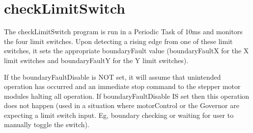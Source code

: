 				
	\section{checkLimitSwitch}
	\label{sec:PLC-flowcharts-limit}
		The checkLimitSwitch program is run in a Periodic Task of 10ms and monitors the four limit switches. Upon detecting a rising edge from one of these limit switches, it sets the appropriate boundaryFault value (boundaryFaultX for the X limit switches and boundaryFaultY for the Y limit switches).
		
		If the boundaryFaultDisable is NOT set, it will assume that unintended operation has occurred and an immediate stop command to the stepper motor modules halting all operation. If boundaryFaultDisable IS set then this operation does not happen (used in a situation where motorControl or the Governor are expecting a limit switch input. Eg, boundary checking or waiting for user to manually toggle the switch).